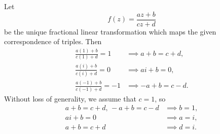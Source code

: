 \documentclass[12pt]{article}
\begin{document}
Let
\[f(z) = \frac{az+b}{cz+d}\]
be the unique fractional linear transformation which maps the given correspondence of triples. Then
\begin{align*}
    \frac{a(1)+b}{c(1)+d} = 1 &\implies a+b = c+d, \\
    \frac{a(i)+b}{c(i)+d} = 0 &\implies ai + b = 0, \\
    \frac{a(-1)+b}{c(-1)+d} = -1 &\implies -a + b = c -d.
\end{align*}
Without loss of generality, we assume that $c=1$, so
\begin{align*}
    a+b = c+d,\, -a + b = c -d  &\implies b = 1, \\
    ai + b = 0 &\implies a = i, \\
    a+b = c+d &\implies d = i.
\end{align*}
\end{document}
